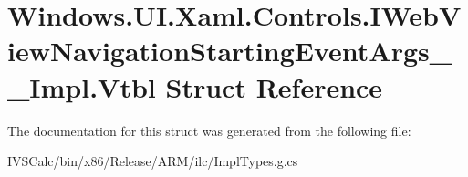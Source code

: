 \hypertarget{struct_windows_1_1_u_i_1_1_xaml_1_1_controls_1_1_i_web_view_navigation_starting_event_args_____impl_1_1_vtbl}{}\section{Windows.\+U\+I.\+Xaml.\+Controls.\+I\+Web\+View\+Navigation\+Starting\+Event\+Args\+\_\+\+\_\+\+Impl.\+Vtbl Struct Reference}
\label{struct_windows_1_1_u_i_1_1_xaml_1_1_controls_1_1_i_web_view_navigation_starting_event_args_____impl_1_1_vtbl}


The documentation for this struct was generated from the following file\+:\begin{DoxyCompactItemize}
\item 
I\+V\+S\+Calc/bin/x86/\+Release/\+A\+R\+M/ilc/Impl\+Types.\+g.\+cs\end{DoxyCompactItemize}
